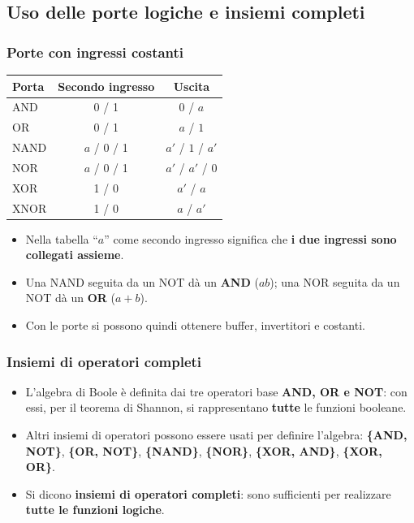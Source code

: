 \documentclass[12pt, a4paper]{article}
\begin{document}
\subsection{Uso delle porte logiche e insiemi completi}

\subsubsection{Porte con ingressi costanti}
\begin{center}
\renewcommand{\arraystretch}{1.3}
\begin{tabular}{|l|c|c|}
\hline
\colorbox{gray!25}{\color{black}\textbf{Porta}} & \colorbox{gray!25}{\color{black}\textbf{Secondo ingresso}} & \colorbox{gray!25}{\color{black}\textbf{Uscita}} \\ \hline
AND & 0 / 1 & $0$ / $a$ \\ \hline
OR & 0 / 1 & $a$ / $1$ \\ \hline
NAND & $a$ / 0 / 1 & $a'$ / $1$ / $a'$ \\ \hline
NOR & $a$ / 0 / 1 & $a'$ / $a'$ / $0$ \\ \hline
XOR & 1 / 0 & $a'$ / $a$ \\ \hline
XNOR & 1 / 0 & $a$ / $a'$ \\ \hline
\end{tabular}
\end{center}
\begin{itemize}
    \item Nella tabella ``$a$'' come secondo ingresso significa che \textbf{i due ingressi sono collegati assieme}.
    \item Una NAND seguita da un NOT dà un \textbf{AND} ($ab$); una NOR seguita da un NOT dà un \textbf{OR} ($a + b$).
    \item Con le porte si possono quindi ottenere buffer, invertitori e costanti.
\end{itemize}

\subsubsection{Insiemi di operatori completi}
\begin{itemize}
    \item L'algebra di Boole è definita dai tre operatori base \textbf{AND, OR e NOT}: con essi, per il teorema di Shannon, si rappresentano \textbf{tutte} le funzioni booleane.
    \item Altri insiemi di operatori possono essere usati per definire l'algebra: \textbf{\{AND, NOT\}}, \textbf{\{OR, NOT\}}, \textbf{\{NAND\}}, \textbf{\{NOR\}}, \textbf{\{XOR, AND\}}, \textbf{\{XOR, OR\}}.
    \item Si dicono \textbf{insiemi di operatori completi}: sono sufficienti per realizzare \textbf{tutte le funzioni logiche}.
\end{itemize}
\end{document}
